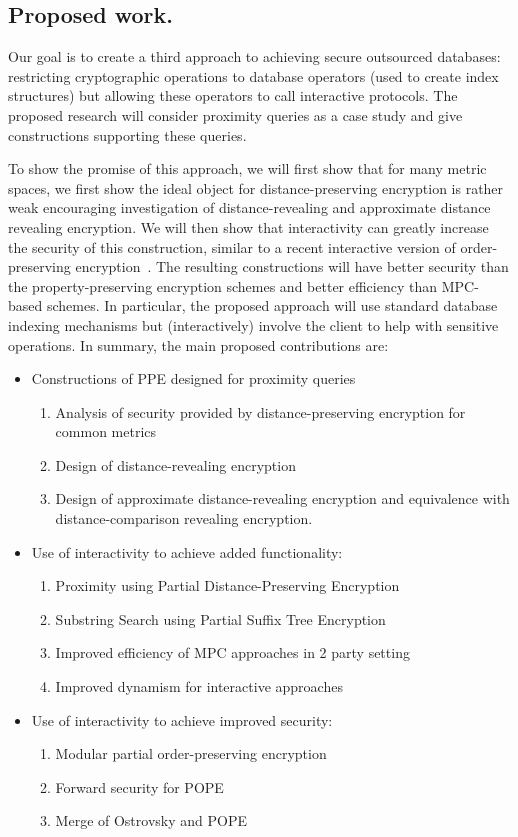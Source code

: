 \subsection{Proposed work.}
Our goal is to create a third approach to achieving secure outsourced databases: restricting cryptographic operations to database operators (used to create index structures) but allowing these operators to call interactive protocols. The proposed research will
consider proximity queries as a case study and give constructions supporting
these queries. 

To show the promise of this approach, we will first show that for many metric
spaces, we first show the ideal object for distance-preserving encryption is rather weak encouraging investigation of distance-revealing and approximate distance revealing encryption.  We will then show that interactivity can greatly increase the security of this construction, similar to a recent interactive version of order-preserving encryption~\cite{CCS:RACY16}. The resulting constructions will have
better security than the property-preserving encryption schemes and better
efficiency than MPC-based schemes. In particular, the proposed approach will
use standard database indexing mechanisms but (interactively) involve the
client to help with sensitive operations. 
In summary, the main proposed contributions are:
\begin{itemize}
\item Constructions of PPE designed for proximity queries
\begin{enumerate}
\item Analysis of security provided by distance-preserving encryption for common metrics
\item Design of distance-revealing encryption
\item Design of approximate distance-revealing encryption and equivalence with distance-comparison revealing encryption.
\end{enumerate}
\item Use of interactivity to achieve added functionality:
\begin{enumerate}
\item Proximity using Partial Distance-Preserving Encryption
\item Substring Search using Partial Suffix Tree Encryption
\item Improved efficiency of MPC approaches in 2 party setting
\item Improved dynamism for interactive approaches
\end{enumerate}
\item Use of interactivity to achieve improved security:
\begin{enumerate}
\item Modular partial order-preserving encryption
\item Forward security for POPE
\item Merge of Ostrovsky and POPE
\end{enumerate}
\end{itemize}


